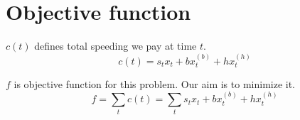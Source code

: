 \section{Objective function}

\begin{definition}{$c(t)$}
defines total speeding we pay at time $t$.
    \begin{equation}
        \label{eq:cost-t}
        c(t) = s_t x_t + b x^{(b)}_t + h x^{(h)}_t
    \end{equation}
\end{definition}

\begin{definition}{$f$}
    is objective function for this problem. Our aim is to minimize it.
    \begin{equation}
        f =  \sum_t{c(t)} = \sum_t{ s_t x_t + b x^{(b)}_t + h x^{(h)}_t}
        \label{eq:cost-f}
    \end{equation}
\end{definition}
